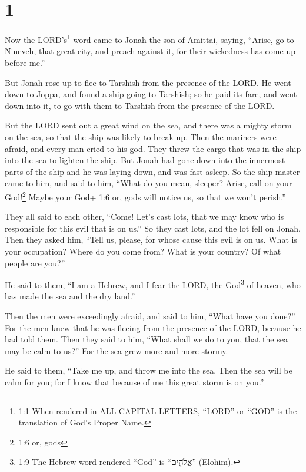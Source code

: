 \hypertarget{section}{%
\section{1}\label{section}}

 Now the LORD's\footnote{1:1 When rendered in ALL CAPITAL
  LETTERS, ``LORD'' or ``GOD'' is the translation of God's Proper Name.}
word came to Jonah the son of Amittai, saying,  ``Arise, go
to Nineveh, that great city, and preach against it, for their wickedness
has come up before me.''

 But Jonah rose up to flee to Tarshish from the presence of
the LORD. He went down to Joppa, and found a ship going to Tarshish; so
he paid its fare, and went down into it, to go with them to Tarshish
from the presence of the LORD.

 But the LORD sent out a great wind on the sea, and there
was a mighty storm on the sea, so that the ship was likely to break up.
 Then the mariners were afraid, and every man cried to his
god. They threw the cargo that was in the ship into the sea to lighten
the ship. But Jonah had gone down into the innermost parts of the ship
and he was laying down, and was fast asleep.  So the ship
master came to him, and said to him, ``What do you mean, sleeper? Arise,
call on your God!\footnote{1:6 or, gods} Maybe your God+ 1:6 or, gods
will notice us, so that we won't perish.''

 They all said to each other, ``Come! Let's cast lots, that
we may know who is responsible for this evil that is on us.'' So they
cast lots, and the lot fell on Jonah.  Then they asked him,
``Tell us, please, for whose cause this evil is on us. What is your
occupation? Where do you come from? What is your country? Of what people
are you?''

 He said to them, ``I am a Hebrew, and I fear the LORD, the
God\footnote{1:9 The Hebrew word rendered ``God'' is ``אֱלֹהִ֑ים''
  (Elohim).} of heaven, who has made the sea and the dry land.''

 Then the men were exceedingly afraid, and said to him,
``What have you done?'' For the men knew that he was fleeing from the
presence of the LORD, because he had told them.  Then they
said to him, ``What shall we do to you, that the sea may be calm to
us?'' For the sea grew more and more stormy.

 He said to them, ``Take me up, and throw me into the sea.
Then the sea will be calm for you; for I know that because of me this
great storm is on you.''

